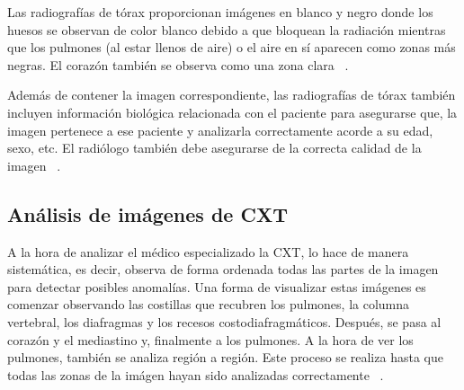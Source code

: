 Las radiografías de tórax proporcionan imágenes en blanco y negro donde los huesos se observan de color blanco debido a que bloquean la radiación mientras que los pulmones (al estar llenos de aire) o el aire en sí aparecen como zonas más negras. El corazón también se observa como una zona clara ~\cite{Mayoclinic24}.

Además de contener la imagen correspondiente, las radiografías de tórax también incluyen información biológica relacionada con el paciente para asegurarse que, la imagen pertenece a ese paciente y analizarla correctamente acorde a su edad, sexo, etc. El radiólogo también debe asegurarse de la correcta calidad de la imagen ~\cite{gelaw15}.

\subsection{Análisis de imágenes de CXT}

A la hora de analizar el médico especializado la CXT, lo hace de manera sistemática, es decir, observa de forma ordenada todas las partes de la imagen para detectar posibles anomalías. Una forma de visualizar estas imágenes es comenzar observando las costillas que recubren los pulmones, la columna vertebral, los diafragmas y los recesos costodiafragmáticos. Después, se pasa al corazón y el mediastino y, finalmente a los pulmones. A la hora de ver los pulmones, también se analiza región a región. Este proceso se realiza hasta que todas las zonas de la imágen hayan sido analizadas correctamente ~\cite{gelaw15}.

